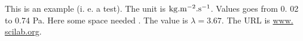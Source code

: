 This is an example (i.
e. a test).
The unit is $\rm kg.
m^{-2}.s^{-1}$.
Values goes from 0.
02 to 0.74 Pa.
Here some space needed \hspace{0.
	5cm}.
The value is $\lambda=3.
67$.
The URL is \url{www.
	scilab.org}.

